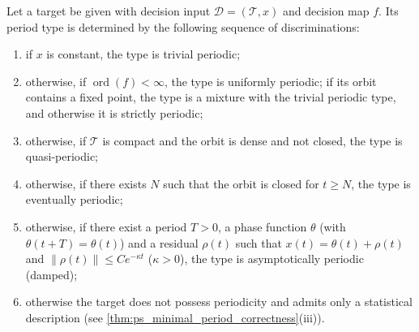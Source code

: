 \begin{proposition}\label{prop:ps_type_discrimination}
Let a target be given with decision input $\mathcal{D}=(\mathcal{T},x)$ and decision map $f$. Its period type is determined by the following sequence of discriminations:
\begin{enumerate}[label=(\roman*)]
    \item if $x$ is constant, the type is trivial periodic;
    \item otherwise, if $\operatorname{ord}(f)<\infty$, the type is uniformly periodic; if its orbit contains a fixed point, the type is a mixture with the trivial periodic type, and otherwise it is strictly periodic;
    \item otherwise, if $\mathcal{T}$ is compact and the orbit is dense and not closed, the type is quasi-periodic;
    \item otherwise, if there exists $N$ such that the orbit is closed for $t\ge N$, the type is eventually periodic;
    \item otherwise, if there exist a period $T>0$, a phase function $\theta$ (with $\theta(t+T)=\theta(t)$) and a residual $\rho(t)$ such that $x(t)=\theta(t)+\rho(t)$ and $\|\rho(t)\|\le Ce^{-\kappa t}$ ($\kappa>0$), the type is asymptotically periodic (damped);
    \item otherwise the target does not possess periodicity and admits only a statistical description (see \cref{thm:ps_minimal_period_correctness}(iii)).
\end{enumerate}
\end{proposition}

